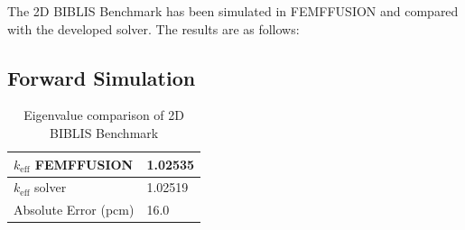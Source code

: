 The 2D BIBLIS Benchmark has been simulated in FEMFFUSION \cite{vidal-ferrandizFEMFFUSIONFiniteElement2023} and compared with the developed solver. The results are as follows:

\subsection{Forward Simulation}
\begin{table}[H]
        \centering
        \caption{Eigenvalue comparison of 2D BIBLIS Benchmark}
        \label{table:BIBLIS_fw_results}
        \begin{tabular}{ | M{3.5cm} | M{2cm} | } 
         \hline
         $k_{\text{eff}}$ FEMFFUSION & 1.02535  \\
         \hline
         $k_{\text{eff}}$ solver & 1.02519  \\
         \hline
         Absolute Error (pcm) & 16.0  \\
         \hline
        \end{tabular}
\end{table}

